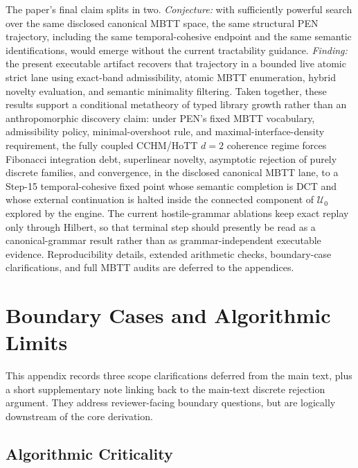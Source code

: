 \documentclass[11pt,a4paper]{article}
\theoremstyle{plain}
\theoremstyle{definition}
\theoremstyle{remark}
\newcommand{\U}{\mathcal{U}}
\begin{document}
The paper's final claim splits in two.
\emph{Conjecture:} with sufficiently powerful search over the same disclosed canonical MBTT space, the same structural PEN trajectory, including the same temporal-cohesive endpoint and the same semantic identifications, would emerge without the current tractability guidance.
\emph{Finding:} the present executable artifact recovers that trajectory in a bounded live atomic strict lane using exact-band admissibility, atomic MBTT enumeration, hybrid novelty evaluation, and semantic minimality filtering.
Taken together, these results support a conditional metatheory of typed library growth rather than an anthropomorphic discovery claim: under PEN's fixed MBTT vocabulary, admissibility policy, minimal-overshoot rule, and maximal-interface-density requirement, the fully coupled CCHM/HoTT $d=2$ coherence regime forces Fibonacci integration debt, superlinear novelty, asymptotic rejection of purely discrete families, and convergence, in the disclosed canonical MBTT lane, to a Step-15 temporal-cohesive fixed point whose semantic completion is DCT and whose external continuation is halted inside the connected component of $\U_0$ explored by the engine. The current hostile-grammar ablations keep exact replay only through Hilbert, so that terminal step should presently be read as a canonical-grammar result rather than as grammar-independent executable evidence.
Reproducibility details, extended arithmetic checks, boundary-case clarifications, and full MBTT audits are deferred to the appendices.

\appendix

\section{Boundary Cases and Algorithmic Limits}
\label{sec:boundaries}

This appendix records three scope clarifications deferred from the main text, plus a short supplementary note linking back to the main-text discrete rejection argument.
They address reviewer-facing boundary questions, but are logically downstream of the core derivation.

\subsection{Algorithmic Criticality}
\label{sec:criticality}
\end{document}
